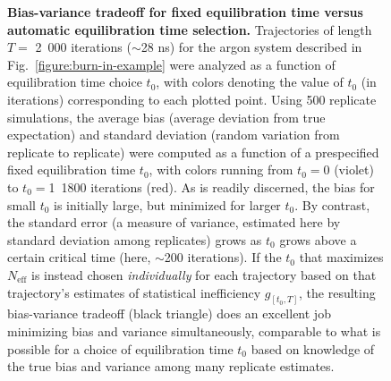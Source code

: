 \documentclass[aps,pre,twocolumn,nofootinbib,superscriptaddress,linenumbers,11point]{revtex4-1}
\begin{document}

\begin{figure}[tbp]
\caption{\label{figure:bias-variance} {\bf Bias-variance tradeoff for fixed equilibration time versus automatic equilibration time selection.} 
Trajectories of length $T = $ 2~000 iterations ($\sim$28 ns) for the argon system described in Fig.~\ref{figure:burn-in-example} were analyzed as a function of equilibration time choice $t_0$, with colors denoting the value of $t_0$ (in iterations) corresponding to each plotted point.
Using 500 replicate simulations, the average bias (average deviation from true expectation) and standard deviation (random variation from replicate to replicate) were computed as a function of a prespecified fixed equilibration time $t_0$, with colors running from $t_0 = 0$ (violet) to $t_0 =$1~1800 iterations (red).
As is readily discerned, the bias for small $t_0$ is initially large, but minimized for larger $t_0$.
By contrast, the standard error (a measure of variance, estimated here by standard deviation among replicates) grows as $t_0$ grows above a certain critical time (here, $\sim$200 iterations).
If the $t_0$ that maximizes $N_\mathrm{eff}$ is instead chosen \emph{individually} for each trajectory based on that trajectory's estimates of statistical inefficiency $g_{[t_0,T]}$, the resulting bias-variance tradeoff (black triangle) does an excellent job minimizing bias and variance simultaneously, comparable to what is possible for a choice of equilibration time $t_0$ based on knowledge of the true bias and variance among many replicate estimates.
}
\end{figure}
\end{document}
